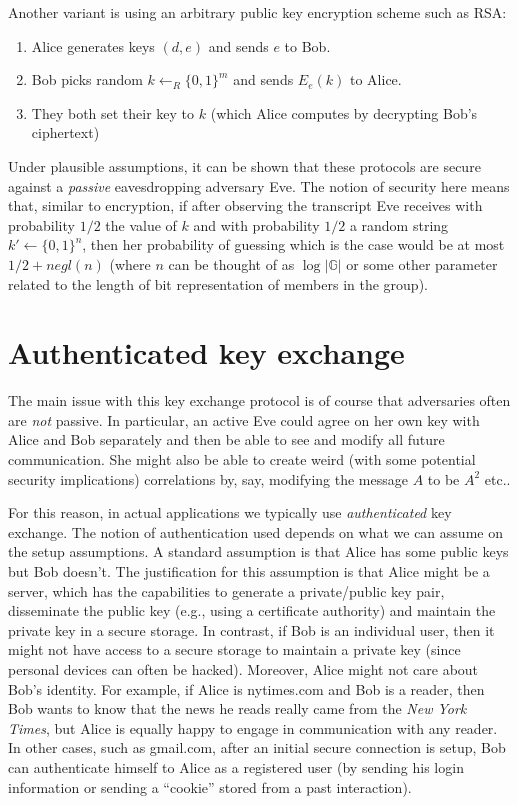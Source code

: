 Another variant is using an arbitrary public key encryption scheme such
as RSA:

\begin{enumerate}
\def\labelenumi{\arabic{enumi}.}
\item
  Alice generates keys \((d,e)\) and sends \(e\) to Bob.
\item
  Bob picks random \(k \leftarrow_R\{0,1\}^m\) and sends \(E_e(k)\) to
  Alice.
\item
  They both set their key to \(k\) (which Alice computes by decrypting
  Bob's ciphertext)
\end{enumerate}

Under plausible assumptions, it can be shown that these protocols are
secure against a \emph{passive} eavesdropping adversary Eve. The notion
of security here means that, similar to encryption, if after observing
the transcript Eve receives with probability \(1/2\) the value of \(k\)
and with probability \(1/2\) a random string \(k'\gets\{0,1\}^n\), then
her probability of guessing which is the case would be at most
\(1/2+negl(n)\) (where \(n\) can be thought of as \(\log |\mathbb{G}|\)
or some other parameter related to the length of bit representation of
members in the group).

\section{Authenticated key exchange}\label{12-Authenticated-key-exch}

The main issue with this key exchange protocol is of course that
adversaries often are \emph{not} passive. In particular, an active Eve
could agree on her own key with Alice and Bob separately and then be
able to see and modify all future communication. She might also be able
to create weird (with some potential security implications) correlations
by, say, modifying the message \(A\) to be \(A^2\) etc..

For this reason, in actual applications we typically use
\emph{authenticated} key exchange. The notion of authentication used
depends on what we can assume on the setup assumptions. A standard
assumption is that Alice has some public keys but Bob doesn't. The
justification for this assumption is that Alice might be a server, which
has the capabilities to generate a private/public key pair, disseminate
the public key (e.g., using a certificate authority) and maintain the
private key in a secure storage. In contrast, if Bob is an individual
user, then it might not have access to a secure storage to maintain a
private key (since personal devices can often be hacked). Moreover,
Alice might not care about Bob's identity. For example, if Alice is
nytimes.com and Bob is a reader, then Bob wants to know that the news he
reads really came from the \emph{New York Times}, but Alice is equally
happy to engage in communication with any reader. In other cases, such
as gmail.com, after an initial secure connection is setup, Bob can
authenticate himself to Alice as a registered user (by sending his login
information or sending a ``cookie'' stored from a past interaction).

